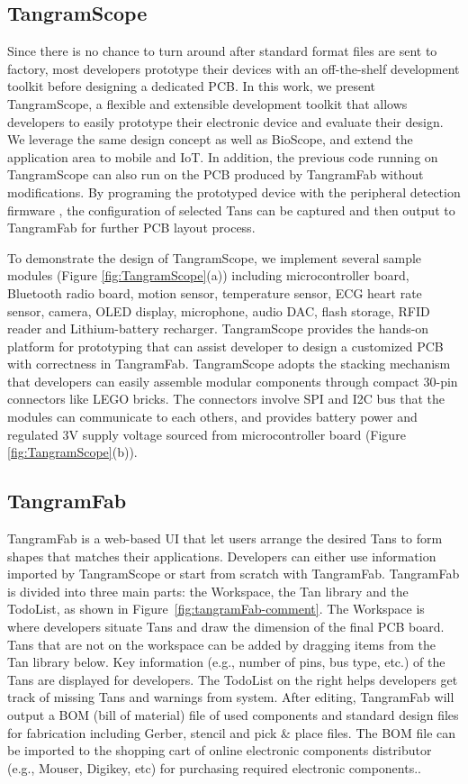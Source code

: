 \subsection{TangramScope}
Since there is no chance to turn around after standard format files are sent to factory, most developers prototype their devices with an off-the-shelf development toolkit before designing a dedicated PCB.
In this work, we present TangramScope, a flexible and extensible development toolkit that allows developers to easily prototype their electronic device and evaluate their design.
We leverage the same design concept as well as BioScope, and extend the application area to mobile and IoT.
In addition, the previous code running on TangramScope can also run on the PCB produced by TangramFab without modifications.
By programing the prototyped device with the peripheral detection firmware , the configuration of selected Tans can be captured and then output to TangramFab for further PCB layout process.

To demonstrate the design of TangramScope, we implement several sample modules (Figure \ref{fig:TangramScope}(a)) including microcontroller board, Bluetooth radio board, motion sensor, temperature sensor, ECG heart rate sensor, camera, OLED display, microphone, audio DAC, flash storage, RFID reader and Lithium-battery recharger.
TangramScope provides the hands-on platform for prototyping that can assist developer to design a customized PCB with correctness in TangramFab.
TangramScope adopts the stacking mechanism that developers can easily assemble modular components through compact 30-pin connectors like LEGO bricks.
The connectors involve SPI and I2C bus that the modules can communicate to each others, and provides battery power and regulated 3V supply voltage sourced from microcontroller board (Figure \ref{fig:TangramScope}(b)).


\subsection{TangramFab}
TangramFab is a web-based UI that let users arrange the desired Tans to form shapes that matches their applications.
Developers can either use information imported by TangramScope or start from scratch with TangramFab.
TangramFab is divided into three main parts: the Workspace, the Tan library and the TodoList, as shown in Figure~\ref{fig:tangramFab-comment}.
The Workspace is where developers situate Tans and draw the dimension of the final PCB board.
Tans that are not on the workspace can be added by dragging items from the Tan library below.
Key information (e.g., number of pins, bus type, etc.) of the Tans are displayed for developers.
The TodoList on the right helps developers get track of missing Tans and warnings from system.
After editing, TangramFab will output a BOM (bill of material) file of used components and standard design files for fabrication including Gerber, stencil and pick $\&$ place files.
The BOM file can be imported to the shopping cart of online electronic components distributor (e.g., Mouser, Digikey, etc) for purchasing required electronic components..


